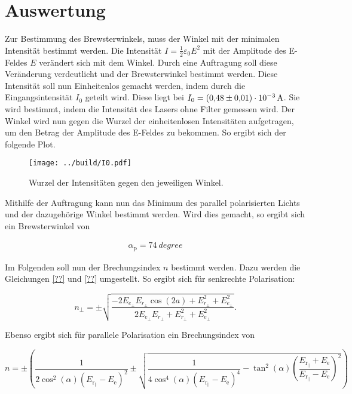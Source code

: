 


\section{Auswertung}
\label{sec:Auswertung}

Zur Bestimmung des Brewsterwinkels, muss der Winkel mit der minimalen Intensität bestimmt werden. 
Die Intensität $I=\frac1 2 \varepsilon_0 E^2$ mit der Amplitude des E-Feldes $E$ verändert sich mit dem Winkel. 
Durch eine Auftragung soll diese Veränderung verdeutlicht und der Brewsterwinkel bestimmt werden. 
Diese Intensität soll nun Einheitenlos gemacht werden, indem durch die Eingangsintensität $I_0$ geteilt wird. 
Diese liegt bei $I_0=\qty{0.48\pm0.01e-3}{\ampere}$. Sie wird bestimmt, indem die Intensität des Lasers ohne 
Filter gemessen wird. 
Der Winkel wird nun gegen die Wurzel der einheitenlosen Intensitäten aufgetragen, um den Betrag der Amplitude des E-Feldes zu bekommen. 
So ergibt sich der folgende Plot.

\begin{figure}
    \centering
    \texttt{[image: ../build/I0.pdf]}
    \caption{Wurzel der Intensitäten gegen den jeweiligen Winkel.}
\end{figure}

\noindent Mithilfe der Auftragung kann nun das Minimum des parallel polarisierten Lichts und der dazugehörige Winkel bestimmt werden. 
Wird dies gemacht, so ergibt sich ein Brewsterwinkel von 

\begin{align}
    \alpha_\text{p} = \qty{74}{degree}
\end{align}

\noindent Im Folgenden soll nun der Brechungsindex $n$ bestimmt werden. Dazu werden die Gleichungen \eqref{??} und \eqref{??} umgestellt. 
So ergibt sich für senkrechte Polarisation:

\begin{equation}
    n_\bot = \pm\sqrt{\frac{-2 E_{e_\bot} E_{r_\bot} \cos{(2a)} + E_{r_\bot}^2 + E_{e_\bot}^2 }{ 2 E_{e_\bot} E_{r_\bot} + E_{r_\bot}^2 + E_{e_\bot}^2  }}.
\end{equation}

\noindent Ebenso ergibt sich für parallele Polarisation ein Brechungsindex von 

\begin{equation}
    n = \pm \left( \frac{1}{2 \cos^2(\alpha) (E_{\text{r}_\parallel} - E_\text{e})^2} \pm \sqrt{\frac{1}{4 \cos^4(\alpha) (E_{\text{r}_\parallel} - E_\text{e})^4} - \tan^2(\alpha) \left(\frac{E_{\text{r}_\parallel} + E_\text{e}}{E_{\text{r}_\parallel} - E_\text{e}} \right)^2} \right)
\end{equation}

